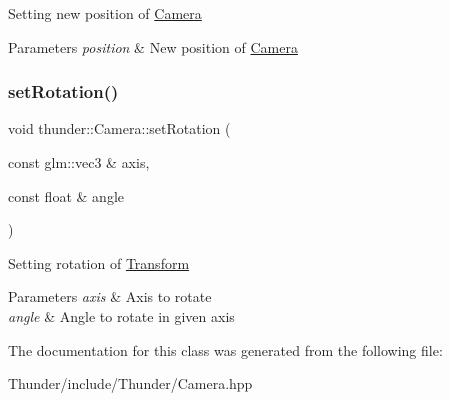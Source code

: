 Setting new position of \mbox{\hyperlink{classthunder_1_1_camera}{Camera}}


\begin{DoxyParams}{Parameters}
{\em position} & New position of \mbox{\hyperlink{classthunder_1_1_camera}{Camera}} \\
\hline
\end{DoxyParams}
\mbox{\label{classthunder_1_1_camera_af585912a2b2efcb4d514ce4983d5faea}} 
\subsubsection{\texorpdfstring{set\+Rotation()}{setRotation()}}
{\footnotesize\ttfamily void thunder\+::\+Camera\+::set\+Rotation (\begin{DoxyParamCaption}\item[{const glm\+::vec3 \&}]{axis,  }\item[{const float \&}]{angle }\end{DoxyParamCaption})}

Setting rotation of \mbox{\hyperlink{classthunder_1_1_transform}{Transform}}


\begin{DoxyParams}{Parameters}
{\em axis} & Axis to rotate \\
\hline
{\em angle} & Angle to rotate in given axis \\
\hline
\end{DoxyParams}


The documentation for this class was generated from the following file\+:\begin{DoxyCompactItemize}
\item 
Thunder/include/\+Thunder/Camera.\+hpp\end{DoxyCompactItemize}
